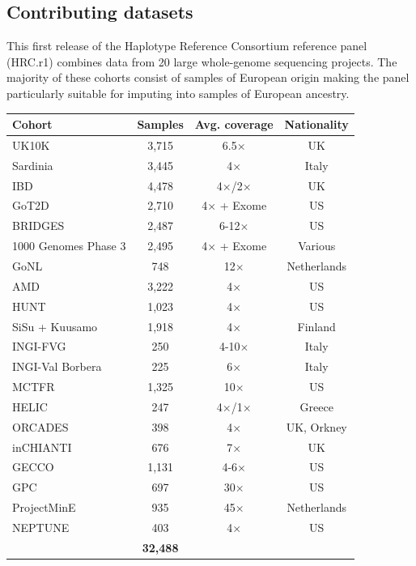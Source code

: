 \documentclass[a0,landscape]{a0poster}
\begin{document}
\begin{multicols}{3}
\subsection*{Contributing datasets}

This first release of the Haplotype Reference Consortium reference panel (HRC.r1) combines data from 20 large whole-genome sequencing projects.
The majority of these cohorts consist of samples of European origin making the panel particularly suitable for imputing into samples of European ancestry.
\begin{center}\vspace{0.5cm}
{\small
\setlength{\tabcolsep}{32pt}
\captionsetup{type=table}
\begin{tabular}{l c c c}
\toprule
\textbf{Cohort} & \textbf{Samples} & \textbf{Avg. coverage} & \textbf{Nationality}\\
\midrule
UK10K & 3,715 & 6.5$\times$ & UK\\
Sardinia & 3,445 & 4$\times$ & Italy\\
IBD & 4,478 & 4$\times$/2$\times$ & UK\\
GoT2D & 2,710 & 4$\times$ + Exome & US\\
BRIDGES & 2,487 & 6-12$\times$ & US\\
1000 Genomes Phase 3 & 2,495 & 4$\times$ + Exome & Various\\
GoNL & 748 & 12$\times$ & Netherlands\\
AMD & 3,222 & 4$\times$ & US\\
HUNT & 1,023 & 4$\times$ & US\\
SiSu + Kuusamo & 1,918 & 4$\times$ & Finland\\
INGI-FVG & 250 & 4-10$\times$ & Italy\\
INGI-Val Borbera & 225 & 6$\times$ & Italy\\
MCTFR & 1,325 & 10$\times$ & US\\
HELIC & 247 & 4$\times$/1$\times$ & Greece\\
ORCADES & 398 & 4$\times$ & UK, Orkney\\
inCHIANTI & 676 & 7$\times$ & UK\\
GECCO & 1,131 & 4-6$\times$ & US\\
GPC & 697 & 30$\times$ & US\\
ProjectMinE & 935 & 45$\times$ & Netherlands\\
NEPTUNE & 403 & 4$\times$ & US\\
\midrule
 & \textbf{32,488} & & \\
\bottomrule
\end{tabular}
}
\end{center}\vspace{0.05cm}


\end{multicols}
\end{document}

